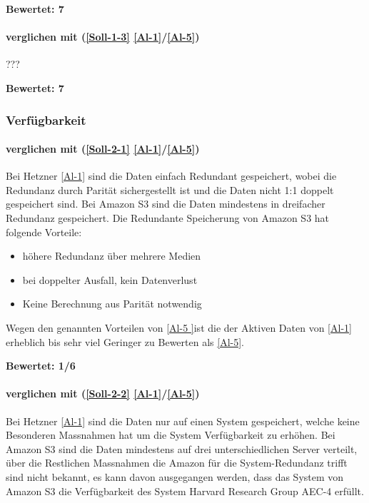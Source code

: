 \textbf{Bewertet: 7}

\paragraph*{  verglichen mit  (\ref{Soll-1-3}  \ref{Al-1}/\ref{Al-5})}

???

\textbf{Bewertet: 7}

\subsubsection{Verfügbarkeit}

\paragraph*{  verglichen mit  (\ref{Soll-2-1}  \ref{Al-1}/\ref{Al-5})}
Bei Hetzner \ref{Al-1} sind die Daten einfach Redundant gespeichert, wobei die Redundanz durch Parität sichergestellt ist und die Daten nicht 1:1 doppelt gespeichert sind. Bei Amazon S3 sind die Daten mindestens in dreifacher Redundanz gespeichert. Die  Redundante Speicherung von Amazon S3 hat folgende Vorteile:

\begin{itemize}
\item höhere Redundanz über mehrere Medien
\item bei doppelter Ausfall, kein Datenverlust
\item Keine Berechnung aus Parität notwendig
\end{itemize}

Wegen den genannten Vorteilen von \ref{Al-5 }ist die  der Aktiven Daten von \ref{Al-1} erheblich bis sehr viel Geringer zu Bewerten als \ref{Al-5}.

\textbf{Bewertet: 1/6}

\paragraph*{  verglichen mit  (\ref{Soll-2-2}  \ref{Al-1}/\ref{Al-5})}
Bei Hetzner \ref{Al-1} sind die Daten nur auf einen System gespeichert, welche keine Besonderen Massnahmen hat um die System Verfügbarkeit zu erhöhen. Bei Amazon S3 sind die Daten mindestens auf drei unterschiedlichen Server verteilt, über die Restlichen Massnahmen die Amazon für die System-Redundanz trifft sind nicht bekannt, es kann davon ausgegangen werden, dass das System von Amazon S3 die Verfügbarkeit des System Harvard Research Group AEC-4 erfüllt.

